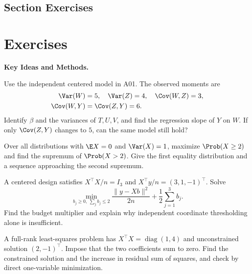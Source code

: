 

\par{}
\subsection*{Section Exercises}


\section{Exercises}
\noindent\textbf{Key Ideas and Methods.}\enspace



\pagebreak
{}
Use the independent centered model in A01. The observed moments are
\[
 \begin{aligned}
 \Var(W)&=5,\quad\Var(Z)=4,\quad\Cov(W,Z)=3,\\
 \Cov(W,Y)&=\Cov(Z,Y)=6.
 \end{aligned}
\]
 Identify $\beta$ and the variances of $T,U,V$, and find the regression slope of $Y$ on $W$. If only $\Cov(Z,Y)$ changes to $5$, can the same model still hold?

Over all distributions with $\E X=0$ and $\Var(X)=1$, maximize $\Prob(X\ge2)$ and find the supremum of $\Prob(X>2)$. Give the first equality distribution and a sequence approaching the second supremum.

A centered design satisfies $X^\top X/n=I_3$ and $X^\top y/n=(3,1,-1)^\top$. Solve
\[
 \min_{b_j\ge0,\ \sum_jb_j\le2}
 \frac{\|y-Xb\|^2}{2n}+\frac12\sum_{j=1}^3b_j.
\]
Find the budget multiplier and explain why independent coordinate thresholding alone is insufficient.

A full-rank least-squares problem has $X^\top X=\operatorname{diag}(1,4)$ and unconstrained solution $(2,-1)^\top$. Impose that the two coefficients sum to zero. Find the constrained solution and the increase in residual sum of squares, and check by direct one-variable minimization.
